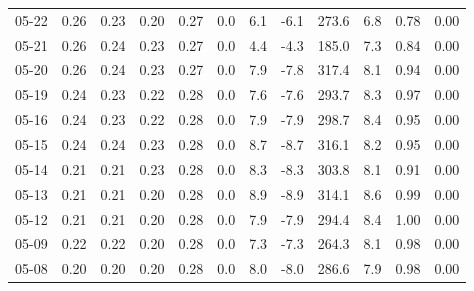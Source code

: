 \begin{threeparttable}
{\begin{tabular}{lrrrrrrrrrrr}
  05-22 &          0.26 &          0.23 &          0.20 &        0.27 &                 0.0 &                 6.1 &       -6.1 &               273.6 &              6.8 &            0.78 &                   0.00 \\
  05-21 &          0.26 &          0.24 &          0.23 &        0.27 &                 0.0 &                 4.4 &       -4.3 &               185.0 &              7.3 &            0.84 &                   0.00 \\
  05-20 &          0.26 &          0.24 &          0.23 &        0.27 &                 0.0 &                 7.9 &       -7.8 &               317.4 &              8.1 &            0.94 &                   0.00 \\
  05-19 &          0.24 &          0.23 &          0.22 &        0.28 &                 0.0 &                 7.6 &       -7.6 &               293.7 &              8.3 &            0.97 &                   0.00 \\
  05-16 &          0.24 &          0.23 &          0.22 &        0.28 &                 0.0 &                 7.9 &       -7.9 &               298.7 &              8.4 &            0.95 &                   0.00 \\
  05-15 &          0.24 &          0.24 &          0.23 &        0.28 &                 0.0 &                 8.7 &       -8.7 &               316.1 &              8.2 &            0.95 &                   0.00 \\
  05-14 &          0.21 &          0.21 &          0.23 &        0.28 &                 0.0 &                 8.3 &       -8.3 &               303.8 &              8.1 &            0.91 &                   0.00 \\
  05-13 &          0.21 &          0.21 &          0.20 &        0.28 &                 0.0 &                 8.9 &       -8.9 &               314.1 &              8.6 &            0.99 &                   0.00 \\
  05-12 &          0.21 &          0.21 &          0.20 &        0.28 &                 0.0 &                 7.9 &       -7.9 &               294.4 &              8.4 &            1.00 &                   0.00 \\
  05-09 &          0.22 &          0.22 &          0.20 &        0.28 &                 0.0 &                 7.3 &       -7.3 &               264.3 &              8.1 &            0.98 &                   0.00 \\
  05-08 &          0.20 &          0.20 &          0.20 &        0.28 &                 0.0 &                 8.0 &       -8.0 &               286.6 &              7.9 &            0.98 &                   0.00 \\

\end{tabular}}
\end{threeparttable}

